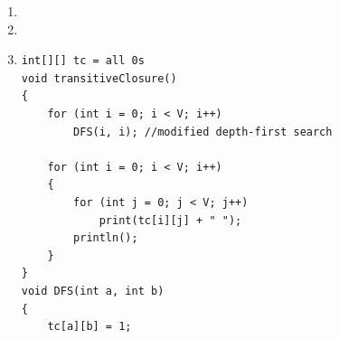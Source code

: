 \documentclass{article}
\begin{document}
\begin{enumerate}
\item \begin{minipage}[t]{\linewidth}
          \raggedright
	\end{minipage}
\item \begin{minipage}[t]{\linewidth}
          \raggedright
	\end{minipage}
\item \begin{lstlisting}
int[][] tc = all 0s
void transitiveClosure()
{
    for (int i = 0; i < V; i++)
        DFS(i, i); //modified depth-first search
 
    for (int i = 0; i < V; i++)
    {
        for (int j = 0; j < V; j++)
            print(tc[i][j] + " ");
        println();
    }
}
void DFS(int a, int b)
{
    tc[a][b] = 1;
 

\end{lstlisting}
\end{enumerate}
\end{document}
